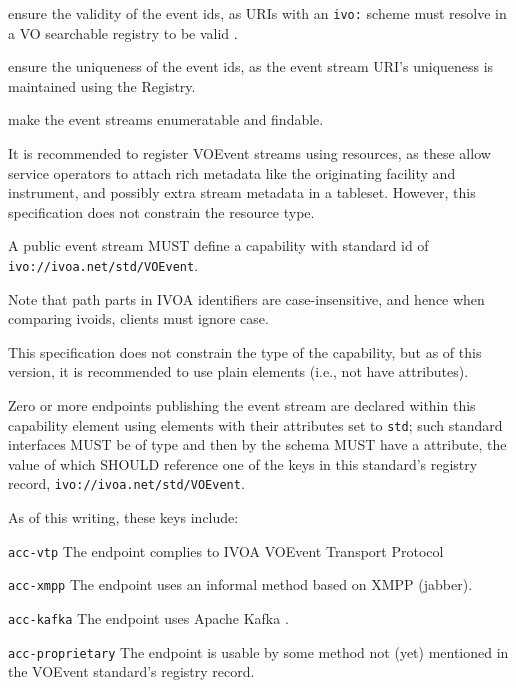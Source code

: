 \documentclass[11pt,a4paper]{ivoa}
\begin{document}
\begin{compactitem}
\item ensure the validity of the event ids, as URIs with an \verb|ivo:|
scheme must resolve in a VO searchable registry to be valid
\citep{2016ivoa.spec.0523D}.
\item ensure the uniqueness of the event ids, as the event stream URI's
uniqueness is maintained using the Registry.
\item make the event streams enumeratable and findable.
\end{compactitem}

It is recommended to register VOEvent streams using
 resources, as these allow service operators
to attach rich metadata like the originating facility and instrument, and
possibly extra stream metadata in a tableset.  However, this
specification does not constrain the resource type.

A public event stream MUST define a capability with standard id of
\nolinkurl{ivo://ivoa.net/std/VOEvent}.

Note that path parts in IVOA identifiers are case-insensitive, and hence
when comparing ivoids, clients must ignore case.

This specification does not constrain the type of the capability, but as
of this version, it is recommended to use plain 
elements (i.e., not have  attributes).

Zero or more endpoints publishing the event stream are declared within
this capability element using  elements with their
 attributes set to \verb|std|; such standard interfaces MUST
be of type  and then by the schema MUST have
a  attribute, the value of which SHOULD reference one
of the keys in this standard's registry record,
\nolinkurl{ivo://ivoa.net/std/VOEvent}.

As of this writing, these keys include:

\begin{compactitem}
\item  \verb|acc-vtp| The endpoint complies to IVOA VOEvent Transport
  Protocol \citep{2017ivoa.spec.0320S}
\item \verb|acc-xmpp| The endpoint uses an informal method based on
    	XMPP (jabber).
\item \verb|acc-kafka| The endpoint uses Apache Kafka \citep{kafka}.
\item \verb|acc-proprietary| The endpoint is usable by some
  method not (yet) mentioned in the VOEvent standard's registry record.
\end{compactitem}
\end{document}

